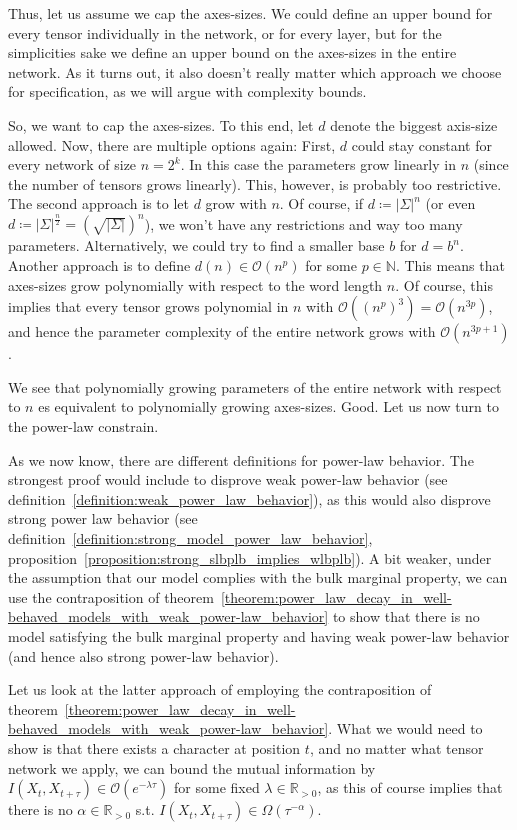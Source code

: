 \documentclass[../../main.tex]{subfiles}
\begin{document}
    Thus, let us assume we cap the axes-sizes. We could define an upper bound for every tensor individually in the network, or for every layer, but for the simplicities sake we define an upper bound on the axes-sizes in the entire network. As it turns out, it also doesn't really matter which approach we choose for specification, as we will argue with complexity bounds.

    So, we want to cap the axes-sizes. To this end, let $d$ denote the biggest axis-size allowed. Now, there are multiple options again: First, $d$ could stay constant for every network of size $n = 2^k$. In this case the parameters grow linearly in $n$ (since the number of tensors grows linearly). This, however, is probably too restrictive. The second approach is to let $d$ grow with $n$. Of course, if $d \coloneqq |\Sigma|^n$ (or even $d \coloneqq |\Sigma|^{\frac{n}{2}} = \left(\sqrt{|\Sigma|}\right)^n$), we won't have any restrictions and way too many parameters. Alternatively, we could try to find a smaller base $b$ for $d = b^n$. Another approach is to define $d(n) \in \mathcal{O}(n^p)$ for some $p \in \mathbb{N}$. This means that axes-sizes grow polynomially with respect to the word length $n$. Of course, this implies that every tensor grows polynomial in $n$ with $\mathcal{O}((n^p)^3) = \mathcal{O}(n^{3p})$, and hence the parameter complexity of the entire network grows with $\mathcal{O}(n^{3p+1})$.

    \bigskip
    We see that polynomially growing parameters of the entire network with respect to $n$ es equivalent to polynomially growing axes-sizes. Good. Let us now turn to the power-law constrain.

    \bigskip
    As we now know, there are different definitions for power-law behavior. The strongest proof would include to disprove weak power-law behavior (see definition~\ref{definition:weak_power_law_behavior}), as this would also disprove strong power law behavior (see definition~\ref{definition:strong_model_power_law_behavior}, proposition~\ref{proposition:strong_slbplb_implies_wlbplb}). A bit weaker, under the assumption that our model complies with the bulk marginal property, we can use the contraposition of theorem~\ref{theorem:power_law_decay_in_well-behaved_models_with_weak_power-law_behavior} to show that there is no model satisfying the bulk marginal property and having weak power-law behavior (and hence also strong power-law behavior).

    Let us look at the latter approach of employing the contraposition of theorem~\ref{theorem:power_law_decay_in_well-behaved_models_with_weak_power-law_behavior}. What we would need to show is that there exists a character at position $t$, and no matter what tensor network we apply, we can bound the mutual information by $I(X_t, X_{t + \tau}) \in \mathcal{O}(e^{-\lambda \tau})$ for some fixed $\lambda \in \mathbb{R}_{>0}$, as this of course implies that there is no $\alpha \in \mathbb{R}_{>0}$ s.t. $I(X_t, X_{t + \tau}) \in \Omega(\tau^{-\alpha})$.
\end{document}
